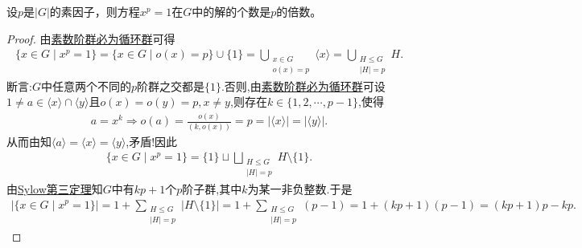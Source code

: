 \documentclass[../../main.tex]{subfiles}%
\begin{document}
\begin{example}
设$p$是$|G|$的素因子，则方程$x^p=1$在$G$中的解的个数是$p$的倍数。
\end{example}
\begin{proof}

由\hyperref[proposition:素数阶群必为循环群]{素数阶群必为循环群}可得
\begin{align*}
\{ x\in G\mid x^p=1 \} =\{ x\in G\mid o(x)=p \} \cup \{ 1 \} =\bigcup\limits_{\substack{x\in G\\o(x)=p}}{\langle x \rangle}=\bigcup\limits_{\substack{H\leqslant G\\|H|=p}}{H}.
\end{align*}
断言:$G$中任意两个不同的$p$阶群之交都是$\{ 1 \}$.否则,由\hyperref[proposition:素数阶群必为循环群]{素数阶群必为循环群}可设$1\ne a\in \langle x \rangle \cap \langle y \rangle$且$o(x)=o(y)=p,x\ne y$,则存在$k\in \{ 1,2,\cdots ,p-1 \} $,使得
\begin{align*}
a=x^k\Longrightarrow o(a)=\frac{o(x)}{(k,o(x))}=p=| \langle x \rangle |=| \langle y \rangle |.
\end{align*}
从而由知$\langle a \rangle =\langle x \rangle =\langle y \rangle $,矛盾!因此
\begin{align*}
\{ x\in G\mid x^p=1 \} =\{ 1 \} \sqcup \bigsqcup\limits_{\substack{H\leqslant G\\|H|=p}}{H\setminus \{ 1 \}}.
\end{align*}
由\hyperref[theorem:Sylow第三定理]{Sylow第三定理}知$G$中有$kp+1$个$p$阶子群,其中$k$为某一非负整数.于是
\begin{align*}
| \{ x\in G\mid x^p=1 \} |=1+\sum\limits_{\substack{H\leqslant G\\|H|=p}}{| H\setminus \{ 1 \} |}=1+\sum\limits_{\substack{H\leqslant G\\|H|=p}}{(p-1)}=1+(kp+1)(p-1)=(kp+1)p-kp.
\end{align*}

\end{proof}
\end{document}
